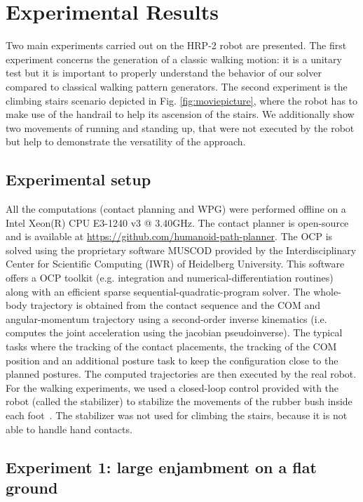 \section{Experimental Results}
\label{sec:experimental}


Two main experiments carried out on the HRP-2 robot are presented. The first experiment concerns the generation of a classic walking motion: it is a unitary test but it is important to properly understand the behavior of our solver compared to classical walking pattern generators. The second experiment is the climbing stairs scenario depicted in Fig. \ref{fig:moviepicture}, where the robot has to make use of the handrail to help its ascension of the stairs. We additionally show two movements of running and standing up, that were not executed by the robot but help to demonstrate the versatility of the approach.

\subsection{Experimental setup}
All the computations (contact planning and WPG) were performed offline on a Intel Xeon(R) CPU E3-1240 v3 @ 3.40GHz. The contact planner is open-source and is available at \url{https://github.com/humanoid-path-planner}. The OCP is solved using the proprietary software MUSCOD provided by the Interdisciplinary Center for Scientific Computing (IWR) of Heidelberg University. This software offers a OCP toolkit (e.g. integration and numerical-differentiation routines) along with an efficient sparse sequential-quadratic-program solver.
The whole-body trajectory is obtained from the contact sequence and the COM and angular-momentum trajectory using a second-order inverse kinematics (i.e. computes the joint acceleration using the jacobian pseudoinverse). The typical tasks where the tracking of the contact placements, the tracking of the COM position and an additional posture task to keep the configuration close to the planned postures.
The computed trajectories are then executed by the real robot. For the walking experiments, we used a closed-loop control provided with the robot (called the stabilizer) to stabilize the movements of the rubber bush inside each foot~\cite{6942670}. The stabilizer was not used for climbing the stairs, because it is not able to handle hand contacts.

\subsection{Experiment 1: large enjambment on a flat ground}

